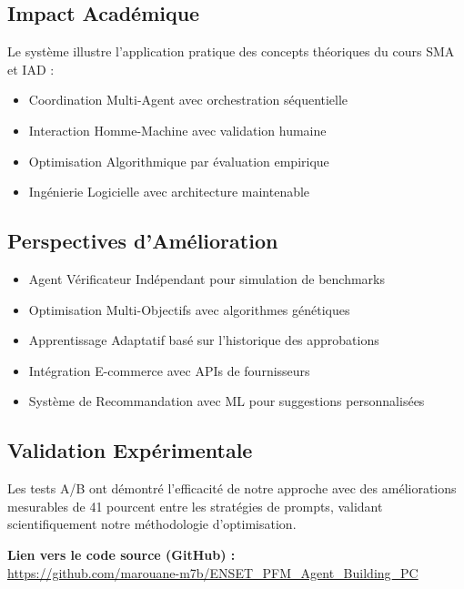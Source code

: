 \documentclass[12pt,a4paper]{article}
\begin{document}
\subsection{Impact Acad\'emique}
Le syst\`eme illustre l'application pratique des concepts th\'eoriques du cours SMA et IAD :
\begin{itemize}
    \item Coordination Multi-Agent avec orchestration s\'equentielle
    \item Interaction Homme-Machine avec validation humaine
    \item Optimisation Algorithmique par \'evaluation empirique
    \item Ing\'enierie Logicielle avec architecture maintenable
\end{itemize}

\subsection{Perspectives d'Am\'elioration}
\begin{itemize}
    \item Agent V\'erificateur Ind\'ependant pour simulation de benchmarks
    \item Optimisation Multi-Objectifs avec algorithmes g\'en\'etiques
    \item Apprentissage Adaptatif bas\'e sur l'historique des approbations
    \item Int\'egration E-commerce avec APIs de fournisseurs
    \item Syst\`eme de Recommandation avec ML pour suggestions personnalis\'ees
\end{itemize}

\subsection{Validation Exp\'erimentale}
Les tests A/B ont d\'emontr\'e l'efficacit\'e de notre approche avec des am\'eliorations mesurables de 41 pourcent entre les strat\'egies de prompts, validant scientifiquement notre m\'ethodologie d'optimisation.

\vspace{1cm}
\textbf{Lien vers le code source (GitHub) :} \\
\url{https://github.com/marouane-m7b/ENSET_PFM_Agent_Building_PC}
\end{document}
